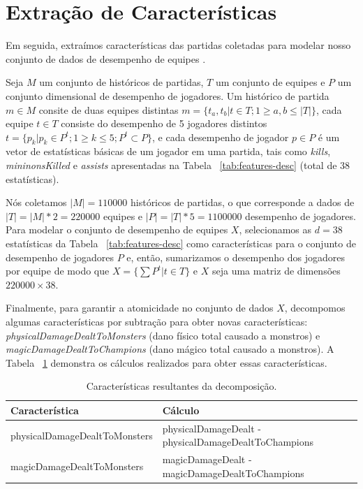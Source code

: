 \section{Extração de Características}
Em seguida, extraímos características das partidas coletadas para modelar nosso conjunto de dados de desempenho de equipes .

Seja $M$ um conjunto de históricos de partidas, $T$ um conjunto de equipes e $P$ um conjunto dimensional de desempenho de jogadores. Um histórico de partida $m \in M$ consite de duas equipes distintas $m = \{ t_a, t_b | t \in {T}; 1 \geq a, b \leq |T| \}$, cada equipe $t \in T$ consiste do desempenho de 5 jogadores distintos $t=\{p_k |  p_k \in P^t; 1 \geq k \leq 5; P^t \subset P\}$, e cada desempenho de jogador $p \in P$ é um vetor de estatísticas básicas de um jogador em uma partida, tais como \textit{kills}, \textit{mininonsKilled} e \textit{assists} apresentadas na Tabela ~\ref{tab:features-desc} (total de 38 estatísticas).

Nós coletamos $|M|=110000$ históricos de partidas, o que corresponde a dados de $|T|= |M| * 2 = 220000$ equipes e $|P|=|T| * 5 = 1100000$ desempenho de jogadores. Para modelar o conjunto de desempenho de equipes $X$, selecionamos as $d=38$ estatísticas da Tabela ~\ref{tab:features-desc} como características para o conjunto de desempenho de jogadores $P$ e, então, sumarizamos o desempenho dos jogadores por equipe de modo que $ X=\{ \sum P^{t} | t \in T \} $ e $X$ seja uma matriz de dimensões $ 220000 \times 38 $.

Finalmente, para garantir a atomicidade no conjunto de dados $X$, decompomos algumas características por subtração para obter novas características: \textit{physicalDamageDealtToMonsters} (dano físico total causado a monstros) e \textit{magicDamageDealtToChampions} (dano m\'agico total causado a monstros). A Tabela ~\ref{tab:decomposed-features} demonstra os cálculos realizados para obter essas características.

\begin{table}
  \scriptsize
  \caption{Características resultantes da decomposição.}
  \label{tab:decomposed-features}
  \begin{tabular}{p{}p{}}
    \toprule
    Característica & Cálculo \\
    \midrule
physicalDamageDealtToMonsters & physicalDamageDealt - physicalDamageDealtToChampions\\
magicDamageDealtToMonsters & magicDamageDealt - magicDamageDealtToChampions \\
  \bottomrule
\end{tabular}
\end{table}

